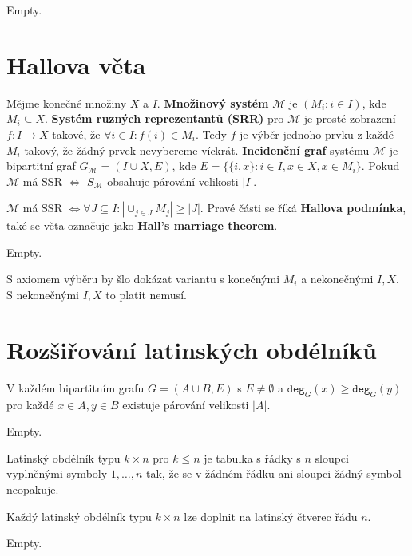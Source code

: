 \begin{dukaz}
	Empty.
\end{dukaz}

\section{Hallova věta}

\begin{definice}
	Mějme konečné množiny $X$ a $I$. \textbf{Množinový systém} $\mathcal{M}$ je $(M_{i}: i \in I)$, kde $M_{i} \subseteq X$. \textbf{Systém ruzných reprezentantů (SRR)} pro $\mathcal{M}$ je prosté zobrazení $f: I \to X$ takové, že $\forall i \in I : f(i) \in M_{i}$. Tedy $f$ je výběr jednoho prvku z každé $M_{i}$ takový, že žádný prvek nevybereme víckrát. \textbf{Incidenční graf} systému $\mathcal{M}$ je bipartitní graf $G_{\mathcal{M}}=(I \cup X, E)$, kde $E = \{ \{ i,x\}: i \in I, x \in X, x \in M_{i} \}$. Pokud $\mathcal{M}$ má SSR $\Leftrightarrow$ $S_{\mathcal{M}}$ obsahuje párování velikosti $|I|$.
\end{definice}

\begin{veta}
	$\mathcal{M}$ má SSR $\Leftrightarrow \forall J \subseteq I: |\cup_{j \in J}M_{j}| \geq |J|$. Pravé části se říká \textbf{Hallova podmínka}, také se věta označuje jako \textbf{Hall's marriage theorem}.
\end{veta}

\begin{definice}
	Empty.
\end{definice}


S axiomem výběru by šlo dokázat variantu s konečnými $M_{i}$ a nekonečnými $I,X$. S nekonečnými $I,X$ to platit nemusí.

\section{Rozšiřování latinských obdélníků}

\begin{dusl}
	V každém bipartitním grafu $G =  (A \cup B, E)$ s $E \neq \emptyset$ a $\mathtt{deg}_{G}(x) \geq \mathtt{deg}_{G}(y)$ pro každé $x \in A, y \in B$ existuje párování velikosti $|A|$.
\end{dusl}

\begin{dukaz}
	Empty.
\end{dukaz}

Latinský obdélník typu $k \times n$ pro $k \leq n$ je tabulka s řádky s $n$ sloupci vyplněnými symboly $1, \dots, n$ tak, že se v žádném řádku ani sloupci žádný symbol neopakuje.

\begin{veta}
	Každý latinský obdélník typu $k \times n$ lze doplnit na latinský čtverec řádu  $n$.
\end{veta}

\begin{dukaz}
	Empty.
\end{dukaz}